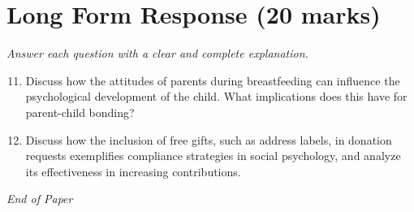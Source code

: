\documentclass[12pt]{article}
\begin{document}
\section*{Long Form Response (20 marks)}
\textit{Answer each question with a clear and complete explanation.}
\begin{enumerate}[label=\arabic*.]
\setcounter{enumi}{10}
\item Discuss how the attitudes of parents during breastfeeding can influence the psychological development of the child. What implications does this have for parent-child bonding?
\item Discuss how the inclusion of free gifts, such as address labels, in donation requests exemplifies compliance strategies in social psychology, and analyze its effectiveness in increasing contributions.
\end{enumerate}

\vfill
\noindent\textit{End of Paper}
\end{document}
